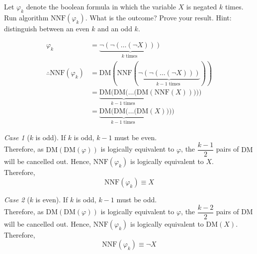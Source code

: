 \documentclass[fleqn, a4paper, 12pt, oneside]{amsart}
\theoremstyle{definition}
\theoremstyle{theorem}
\theoremstyle{remark}
\newtheorem{case}{Case}
\newcommand{\NOT}{\neg}
\begin{document}
\begin{question}
	Let $\varphi_k$ denote the boolean formula in which the variable $X$ is negated $k$ times. Run algorithm $\mathrm{NNF}(\varphi_k)$.
	What is the outcome?
	Prove your result.
	Hint: distinguish between an even $k$ and an odd $k$.
\end{question}

\begin{solution}
	\begin{align*}
		\varphi_k &= \underbrace{\NOT(\NOT(\dots(\NOT X)))}_{k \text{ times }}\\
		\therefore \mathrm{NNF}(\varphi_k) &= \mathrm{DM}(\mathrm{NNF}(\underbrace{\NOT(\NOT(\dots(\NOT X)))}_{k - 1 \text{ times }}))\\
		&= \underbrace{\mathrm{DM}(\mathrm{DM}(\dots(\mathrm{DM}}_{k - 1 \text{ times }}(\mathrm{NNF}(X)))))\\
		&= \underbrace{\mathrm{DM}(\mathrm{DM}(\dots(\mathrm{DM}}_{k - 1 \text{ times }}(X))))
	\end{align*}
	\begin{case}[$k$ is odd]
		If $k$ is odd, $k - 1$ must be even.\\
		Therefore, as $\mathrm{DM}(\mathrm{DM}(\varphi))$ is logically equivalent to $\varphi$, the $\dfrac{k - 1}{2}$ pairs of $\mathrm{DM}$ will be cancelled out.
		Hence, $\mathrm{NNF}(\varphi_k)$ is logically equivalent to $X$.\\
		Therefore,
		\begin{equation*}
			\mathrm{NNF}(\varphi_k) \equiv X
		\end{equation*}
	\end{case}
	\begin{case}[$k$ is even]
		If $k$ is odd, $k - 1$ must be odd.\\
		Therefore, as $\mathrm{DM}(\mathrm{DM}(\varphi))$ is logically equivalent to $\varphi$, the $\dfrac{k - 2}{2}$ pairs of $\mathrm{DM}$ will be cancelled out.
		Hence, $\mathrm{NNF}(\varphi_k)$ is logically equivalent to $\mathrm{DM}(X)$.\\
		Therefore,
		\begin{equation*}
			\mathrm{NNF}(\varphi_k) \equiv \NOT X
		\end{equation*}
	\end{case}
\end{solution}
\end{document}
